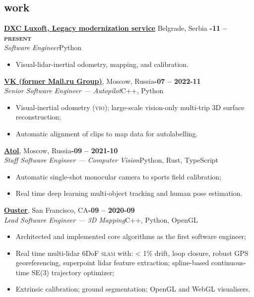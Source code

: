 \documentclass[margin,10pt]{res}
\begin{document}
\begin{resume}
\section{\sc \lsstyle work}
    \href{https://www.luxoft.com/}{\textbf{DXC Luxoft, Legacy modernization service}} Belgrade, Serbia \hfill \textsc{\bfseries{}-11 -- present}\\
    \textit{Software Engineer}\hfill Python
    \vspace{0.5em}
    \begin{itemize}
        \item Visual-lidar-inertial odometry, mapping, and calibration.
    \end{itemize}
    
    \href{https://mail.ru/}{\textbf{VK (former Mail.ru Group)}}, Moscow, Russia\hfill \textsc{\bfseries{}-07 -- 2022-11}\\
    \textit{Senior Software Engineer --- Autopilot}\hfill C++, Python
    \vspace{0.5em}
    \begin{itemize}
        \item Visual-inertial odometry (\textsc{vio}); large-scale vision-only multi-trip 3D surface reconstruction;
        \item Automatic alignment of clips to map data for autolabelling.
    \end{itemize}

    \href{https://tempus-ex.com}{\textbf{Atol}}, Moscow, Russia\hfill \textsc{\bfseries{}-09 -- 2021-10}\\
    \textit{Staff Software Engineer --- Computer Vision}\hfill Python, Rust, TypeScript
    \vspace{0.5em}
    \begin{itemize}
        \item Automatic single-shot monocular camera to sports field calibration;
        \item Real time deep learning multi-object tracking and human pose estimation.
    \end{itemize}

    \href{https://ouster.com}{\textbf{Ouster}}, San Francisco, CA\hfill \textsc{\bfseries{}-09 -- 2020-09}\\
    \textit{Lead Software Engineer --- 3D Mapping}\hfill C++, Python, OpenGL
    \vspace{0.5em}
    \begin{itemize}
        \item Architected and implemented core algorithms as the first software engineer;
        \item Real time multi-lidar 6DoF \textsc{slam} with: < 1\% drift, loop closure, robust GPS georeferencing, superpoint lidar feature extraction; spline-based continuous-time SE(3) trajectory optimizer;
        \item Extrinsic calibration; ground segmentation; OpenGL and WebGL visualisers.
    \end{itemize}

\end{resume}
\end{document}
